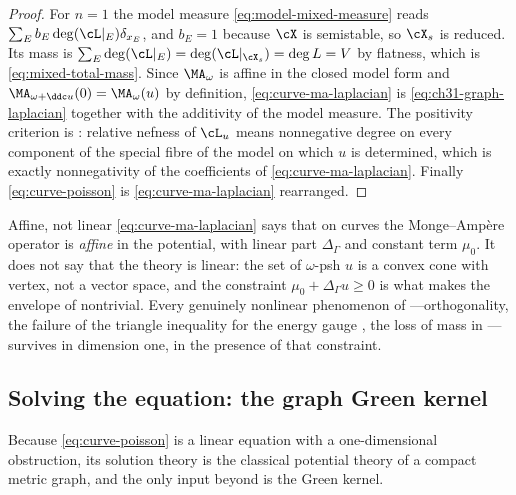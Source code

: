 \begin{proof}
For \(n=1\) the model measure \eqref{eq:model-mixed-measure} reads
\(\sum_Eb_E\deg(\cL|_E)\delta_{x_E}\), and \(b_E=1\) because \(\cX\) is
semistable, so \(\cX_s\) is reduced.  Its mass is
\(\sum_E\deg(\cL|_E)=\deg(\cL|_{\cX_s})=\deg L=V\) by flatness, which is
\eqref{eq:mixed-total-mass}.  Since \(\MA_\omega\) is affine in the closed
model form and \(\MA_{\omega+\ddc u}(0)=\MA_\omega(u)\) by definition,
\eqref{eq:curve-ma-laplacian} is \eqref{eq:ch31-graph-laplacian} together
with the additivity of the model measure.  The positivity criterion is
: relative nefness of \(\cL_u\) means
nonnegative degree on every component of the special fibre of the model on
which \(u\) is determined, which is exactly nonnegativity of the
coefficients of \eqref{eq:curve-ma-laplacian}.  Finally
\eqref{eq:curve-poisson} is \eqref{eq:curve-ma-laplacian} rearranged.
\end{proof}

\begin{warning}{Affine, not linear}
\eqref{eq:curve-ma-laplacian} says that on curves the Monge--Amp\`ere
operator is \emph{affine} in the potential, with linear part
\(\Delta_\Gamma\) and constant term \(\mu_0\).  It does not say that the
theory is linear: the set of \(\omega\)-psh \(u\) is a convex cone with
vertex, not a vector space, and the constraint
\(\mu_0+\Delta_\Gamma u\geq0\) is what makes the envelope of
 nontrivial.  Every genuinely nonlinear phenomenon
of ---orthogonality, the failure of the triangle inequality
for the energy gauge , the loss of mass in
---survives in dimension one, in the presence
of that constraint.
\end{warning}

\subsection{Solving the equation: the graph Green kernel}
\label{sec:ch31-curve-green}

Because \eqref{eq:curve-poisson} is a linear equation with a
one-dimensional obstruction, its solution theory is the classical potential
theory of a compact metric graph, and the only input beyond
 is the Green kernel.


